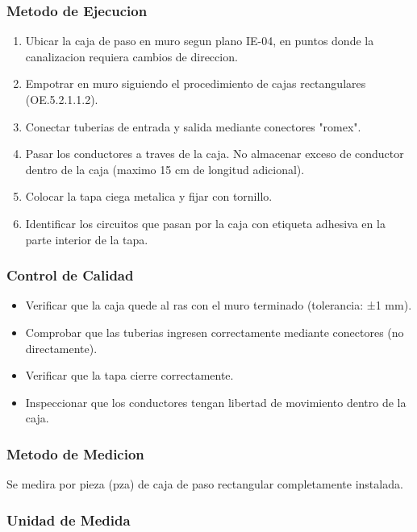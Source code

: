 \subsubsection{Metodo de Ejecucion}

\begin{enumerate}
  \item Ubicar la caja de paso en muro segun plano IE-04, en puntos donde la canalizacion requiera cambios de direccion.
  \item Empotrar en muro siguiendo el procedimiento de cajas rectangulares (OE.5.2.1.1.2).
  \item Conectar tuberias de entrada y salida mediante conectores "romex".
  \item Pasar los conductores a traves de la caja. No almacenar exceso de conductor dentro de la caja (maximo 15 cm de longitud adicional).
  \item Colocar la tapa ciega metalica y fijar con tornillo.
  \item Identificar los circuitos que pasan por la caja con etiqueta adhesiva en la parte interior de la tapa.
\end{enumerate}

\subsubsection{Control de Calidad}

\begin{itemize}
  \item Verificar que la caja quede al ras con el muro terminado (tolerancia: ±1 mm).
  \item Comprobar que las tuberias ingresen correctamente mediante conectores (no directamente).
  \item Verificar que la tapa cierre correctamente.
  \item Inspeccionar que los conductores tengan libertad de movimiento dentro de la caja.
\end{itemize}

\subsubsection{Metodo de Medicion}

Se medira por pieza (pza) de caja de paso rectangular completamente instalada.

\subsubsection{Unidad de Medida}

